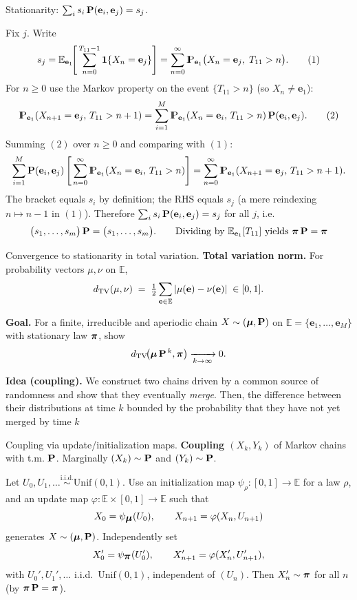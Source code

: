 \documentclass[aspectratio=169]{beamer}
\newcommand{\Prob}{{\rm I\hspace{-0.8mm}P}}
\newcommand{\e}[0]{\textbf{e}}
\newcommand{\E}[0]{\mathbb{E}}
\begin{document}
\begin{frame}{Stationarity: $\sum_i s_i\,\bfP(\e_i,\e_j)=s_j$.}

Fix $j$. Write
\[
s_j=\Exp_{\e_1}\!\Bigg[\sum_{n=0}^{T_{11}-1}\mathbf{1}\{X_n=\e_j\}\Bigg]
=\sum_{n=0}^{\infty}\Prob_{\e_1}\big(X_n=\e_j,\;T_{11}>n\big).
\tag{1}
\]
For $n\ge0$ use the Markov property on the event $\{T_{11}>n\}$ (so $X_n\neq \e_1$):
\[
\Prob_{\e_1}(X_{n+1}=\e_j,\,T_{11}>n+1)
=\sum_{i=1}^M \Prob_{\e_1}(X_n=\e_i,\,T_{11}>n)\,\bfP(\e_i,\e_j).
\tag{2}
\]
Summing \((2)\) over $n\ge0$ and comparing with \((1)\):
\[
\sum_{i=1}^M \bfP(\e_i,\e_j)\,\Bigg[\sum_{n=0}^{\infty}
\Prob_{\e_1}(X_n=\e_i,\,T_{11}>n)\Bigg]
=\sum_{n=0}^{\infty}\Prob_{\e_1}(X_{n+1}=\e_j,\,T_{11}>n+1).
\]
The bracket equals $s_i$ by definition; the RHS equals $s_j$
(a mere reindexing $n\mapsto n-1$ in \((1)\)).
Therefore \(\sum_i s_i\,\bfP(\e_i,\e_j)=s_j\) for all $j$, i.e.
$$
\big(s_1,\dots,s_m\big)\,\bfP=\big(s_1,\dots,s_m\big).
\qquad \textrm{Dividing\ by } \Exp_{\e_1}[T_{11}]
\ \textrm{yields}\ \bfpi\,\bfP=\bfpi $$

\end{frame}

\begin{frame}{Convergence to stationarity in total variation.}
\textbf{Total variation norm.}
For probability vectors \(\mu,\nu\) on \(\E\),
\[
d_{\rm TV}(\mu,\nu)\;=\;\tfrac12\sum_{\e\in\E}|\mu(\e)-\nu(\e)|\;\in[0,1].
\]

\textbf{Goal.} For a finite, irreducible and aperiodic chain \(X\sim(\mbox{\boldmath $\mu$},\mathbf{P})\) on
\(\E=\{\e_1,\dots,\e_M\}\) with stationary law \(\mbox{\boldmath$\pi$}\), show
\[
d_{\rm TV}\!\big(\mbox{\boldmath $\mu$}\,\mathbf{P}^{\,k},\mbox{\boldmath$\pi$}\big)\xrightarrow[k\to\infty]{}0.
\]


\pause
\textbf{Idea (coupling). }We construct two chains driven by a common source of randomness and show that they eventually \emph{merge}.
Then, the difference between their distributions at time
$k$ bounded by the probability that they have not yet merged by time
$k$
\end{frame}


\begin{frame}{Coupling via update/initialization maps.}
\textbf{Coupling $(X_k,Y_k)$} of Markov chains with t.m. $\mathbf{P}$. Marginally $(X_k)\sim \mathbf{P}$ and $(Y_k)\sim\mathbf{P}$.
\medskip\par
Let \(U_0,U_1,\ldots \stackrel{\text{i.i.d.}}{\sim}\mathrm{Unif}(0,1)\).
Use an initialization map \(\psi_\rho:[0,1]\to\E\) for a law \(\rho\),
and an update map \(\varphi:\E\times[0,1]\to\E\) such that
\[
X_0=\psi_{\mbox{\boldmath $\mu$}}(U_0),\qquad X_{n+1}=\varphi(X_n,U_{n+1})
\]
generates \(X\sim(\mbox{\boldmath $\mu$},\mathbf{P})\).
Independently set
\[
X_0'=\psi_{\mbox{\boldmath$\pi$}}(U_0'),\qquad X_{n+1}'=\varphi(X_n',U_{n+1}'),
\]
with \(U_0',U_1',\ldots\) i.i.d.\ \(\mathrm{Unif}(0,1)\), independent of \((U_n)\).
Then \(X_n'\sim\mbox{\boldmath$\pi$}\) for all \(n\) (by \(\mbox{\boldmath$\pi$}\,\mathbf{P}=\mbox{\boldmath$\pi$}\)).

\end{frame}
\end{document}
